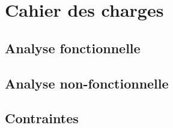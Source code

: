\chapter{Cahier des charges}

\section{Analyse fonctionnelle}

\section{Analyse non-fonctionnelle}

\section {Contraintes}
